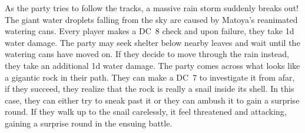 \documentclass[a4paper, titlepage, 11pt, twocolumn] {article}
\begin{document}
{
}
%
\vfill
%
 As the party tries to follow the tracks, a massive rain storm suddenly breaks out! 
The giant water droplets falling from the sky are caused by Matoya's reanimated watering cans.
Every player makes a DC~8 check and upon failure, they take 1d water damage.
The party may seek shelter below nearby leaves and wait until the watering cans have moved on.
If they decide to move through the rain instead, they take an additional 1d water damage.
%
\ofpar
%
 The party comes across what looks like a gigantic rock in their path.
They can make a DC~7 to investigate it from afar, if they succeed, they realize that the rock is really a snail inside its shell.
In this case, they can either try to sneak past it or they can ambush it to gain a surprise round.
If they walk up to the snail carelessly, it feel threatened and attacking, gaining a surprise round in the ensuing battle. 
%
\ofrow
%
\end{document}
